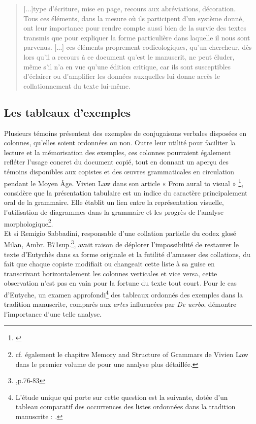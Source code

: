 \documentclass[a4paper, twoside, 12pt]{book}
\begin{document}
\blockquote{[...]type d'écriture, mise en page, recours aux abréviations, décoration. Tous ces éléments, dans la mesure où ils participent d'un système donné, ont leur importance pour rendre compte aussi bien de la survie des textes transmis que pour expliquer la forme particulière dans laquelle il nous sont parvenus. [...] ces éléments proprement codicologiques, qu'un chercheur, dès lors qu'il a recours à ce document qu'est le manuscrit, ne peut éluder, même s'il n'a en vue qu'une édition critique, car ils sont susceptibles d'éclairer ou d'amplifier les données auxquelles lui donne accès le collationnement du texte lui-même.} 

\subsection{Les tableaux d'exemples}

Plusieurs témoins présentent des exemples de conjugaisons verbales disposées en colonnes, qu'elles soient ordonnées ou non. Outre leur utilité pour faciliter la lecture et la mémorisation des exemples, ces colonnes pourraient également refléter l'usage concret du document copié, tout en donnant un aperçu des témoins disponibles aux copistes et des œuvres grammaticales en circulation pendant le Moyen Âge. Vivien Law dans son article « From aural to visual » \footnote{\cite{law1997aural}}, considère que la présentation tabulaire est un indice du caractère principalement oral de la grammaire. Elle établit un lien entre la représentation visuelle, l'utilisation de diagrammes dans la grammaire et les progrès de l'analyse morphologique\footnote{cf. également le chapitre \og{}Memory and Structure of Grammars\fg{} de Vivien Law dans le premier volume de \cite{denonnomanuscripts} pour une analyse plus détaillée.}.\\

Et si Remigio Sabbadini, responsable d'une collation partielle du codex glosé Milan, Ambr. B71sup.\footnote{\cite{sabbadini1995opere},p.76-83}, avait raison de déplorer l'impossibilité de restaurer le texte d'Eutychès dans sa forme originale et la futilité d'amasser des collations, du fait que chaque copiste modifiait ou changeait cette liste à sa guise en transcrivant horizontalement les colonnes verticales et vice versa, cette observation n'est pas en vain pour la fortune du texte tout court. Pour le cas d'Eutyche, un examen approfondi\footnote{L'étude unique qui porte sur cette question est la suivante, dotée d'un tableau comparatif des occurrences des listes ordonnées dans la tradition manuscrite : \cite{conduche2019miseenpage}.} des tableaux ordonnés des exemples dans la tradition manuscrite, comparés aux \textit{artes} influencées par\textit{ De uerbo}, démontre l'importance d'une telle analyse.
\end{document}
